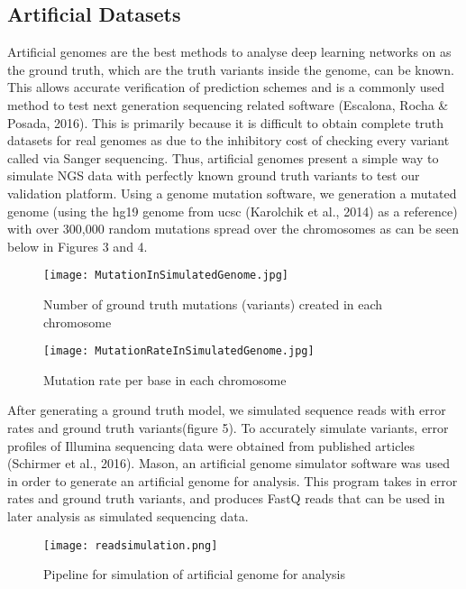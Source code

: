 \documentclass{article}
\begin{document}
\subsection{Artificial Datasets}
Artificial genomes are the best methods to analyse deep learning networks on as the ground truth, which are the truth variants inside the genome, can be known. This allows accurate verification of prediction schemes and is a commonly used method to test next generation sequencing related software (Escalona, Rocha \& Posada, 2016). This is primarily because it is difficult to obtain complete truth datasets for real genomes as due to the inhibitory cost of checking every variant called via Sanger sequencing. Thus, artificial genomes present a simple way to simulate NGS data with perfectly known ground truth variants to test our validation platform. Using a genome mutation software, we generation a mutated genome (using the hg19 genome from ucsc (Karolchik et al., 2014) as a reference) with over 300,000 random mutations spread over the chromosomes as can be seen below in Figures 3 and 4. 

\begin{figure}[H]
\centering
\texttt{[image: MutationInSimulatedGenome.jpg]}
\caption{Number of ground truth mutations (variants) created in each chromosome }
\end{figure}

\begin{figure}[H]
\centering
\texttt{[image: MutationRateInSimulatedGenome.jpg]}
\caption{Mutation rate per base in each chromosome}
\end{figure}

After generating a ground truth model, we simulated sequence reads with error rates and ground truth variants(figure 5). To accurately simulate variants, error profiles of Illumina sequencing data were obtained from published articles (Schirmer et al., 2016). Mason, an artificial genome simulator software was used in order to generate an artificial genome for analysis. This program takes in error rates and ground truth variants, and produces FastQ reads that can be used in later analysis as simulated sequencing data.

\begin{figure}[H]
\texttt{[image: readsimulation.png]}
\caption{Pipeline for simulation of artificial genome for analysis}
\centering
\end{figure}
\end{document}
